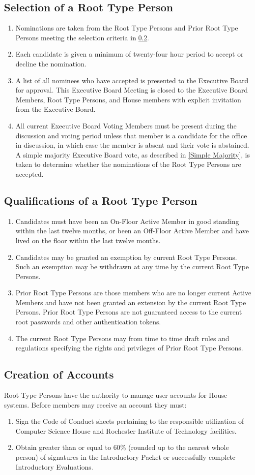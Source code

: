 \documentclass{article}
\newcommand{\bsection}[1]{\subsection{#1} \label{#1}}
\begin{document}
\bsection{Selection of a Root Type Person}
\renewcommand{\theenumi}{\alph{enumi}} %
\begin{enumerate}
	\item Nominations are taken from the Root Type Persons and Prior Root Type Persons meeting the selection criteria in \ref{Qualifications of a Root Type Person}.
	\item Each candidate is given a minimum of twenty-four hour period to accept or decline the nomination.
	\item A list of all nominees who have accepted is presented to the Executive Board for approval. This Executive Board Meeting is closed to the Executive Board Members, Root Type Persons, and House members with explicit invitation from the Executive Board.
	\item All current Executive Board Voting Members must be present during the discussion and voting period unless that member is a candidate for the office in discussion, in which case the member is absent and their vote is abstained.
		A simple majority Executive Board vote, as described in \ref{Simple Majority}, is taken to determine whether the nominations of the Root Type Persons are accepted.
\end{enumerate}

\bsection{Qualifications of a Root Type Person}
\renewcommand{\theenumi}{\alph{enumi}} %
\begin{enumerate}
	\item Candidates must have been an On-Floor Active Member in good standing within the last twelve months, or been an Off-Floor Active Member and have lived on the floor within the last twelve months.
	\item Candidates may be granted an exemption by current Root Type Persons. Such an exemption may be withdrawn at any time by the current Root Type Persons.
	\item Prior Root Type Persons are those members who are no longer current Active Members and have not been granted an extension by the current Root Type Persons.
		Prior Root Type Persons are not guaranteed access to the current root passwords and other authentication tokens.
	\item The current Root Type Persons may from time to time draft rules and regulations specifying the rights and privileges of Prior Root Type Persons.
\end{enumerate}

\bsection{Creation of Accounts}
Root Type Persons have the authority to manage user accounts for House systems. Before members may receive an account they must:
\renewcommand{\theenumi}{\alph{enumi}} %
\begin{enumerate}
	\item Sign the Code of Conduct sheets pertaining to the responsible utilization of Computer Science House and Rochester Institute of Technology facilities.
	\item Obtain greater than or equal to 60\% (rounded up to the nearest whole person) of signatures in the Introductory Packet or successfully complete Introductory Evaluations.
\end{enumerate}
\end{document}
